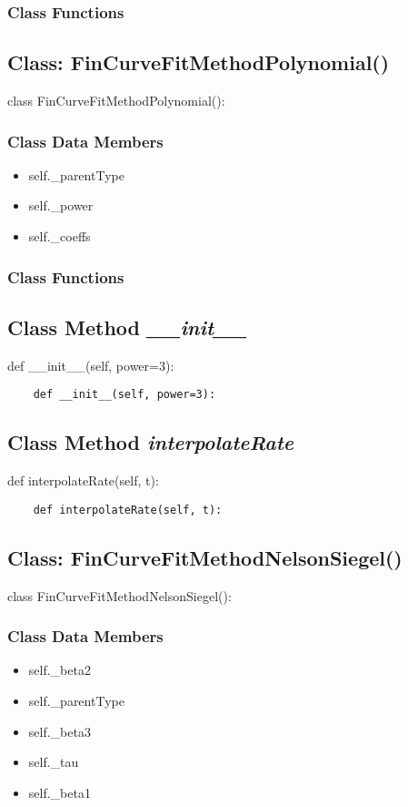 \documentclass[twoside,11pt]{book}
\begin{document}
\subsubsection{Class Functions}

\subsection{Class: FinCurveFitMethodPolynomial()}
class FinCurveFitMethodPolynomial():

\subsubsection{Class Data Members}
\begin{itemize}
\item{self.\_parentType}
\item{self.\_power}
\item{self.\_coeffs}
\end{itemize}

\subsubsection{Class Functions}

\subsection{Class Method {\it \_\_init\_\_}}
def \_\_init\_\_(self, power=3):

\begin{lstlisting}
    def __init__(self, power=3):
\end{lstlisting}

\subsection{Class Method {\it interpolateRate}}
def interpolateRate(self, t):

\begin{lstlisting}
    def interpolateRate(self, t):
\end{lstlisting}

\subsection{Class: FinCurveFitMethodNelsonSiegel()}
class FinCurveFitMethodNelsonSiegel():

\subsubsection{Class Data Members}
\begin{itemize}
\item{self.\_beta2}
\item{self.\_parentType}
\item{self.\_beta3}
\item{self.\_tau}
\item{self.\_beta1}
\end{itemize}
\end{document}
